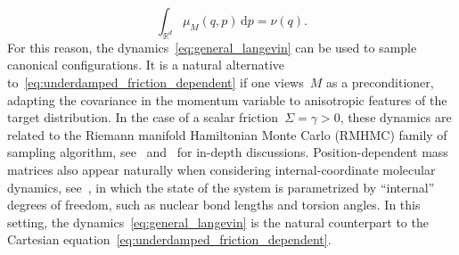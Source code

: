 \documentclass[10pt]{article}
\renewcommand{\d}{\mathrm{d}}
\newcommand{\R}{\mathbb{R}}
\newcommand{\1}{\mathbbm 1}
\begin{document}
\begin{equation}
    \int_{\R^d}\mu_M(q,p)\,\d p = \nu(q).
\end{equation}
For this reason, the dynamics~\eqref{eq:general_langevin} can be used to sample canonical configurations.
It is a natural alternative to~\eqref{eq:underdamped_friction_dependent} if one views~$M$ as a preconditioner, adapting the covariance in the momentum variable to anisotropic features of the target distribution.
In the case of a scalar friction~$\Sigma = \gamma>0$, these dynamics are related to the Riemann manifold Hamiltonian Monte Carlo (RMHMC) family of sampling algorithm, see~\cite{GC11} and~\cite[Section 3.2]{LSS24a} for in-depth discussions.
Position-dependent mass matrices also appear naturally when considering internal-coordinate molecular dynamics, see~\cite{VJ15}, in  which the state of the system is parametrized by ``internal'' degrees of freedom, such as nuclear bond lengths and torsion angles. In this setting, the dynamics~\eqref{eq:general_langevin} is the natural counterpart to the Cartesian equation~\eqref{eq:underdamped_friction_dependent}.
\end{document}

